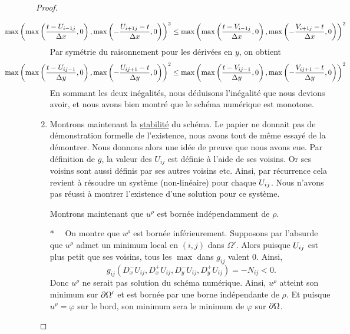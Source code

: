 \begin{proof}
\begin{enumerate}
        \begin{equation*}
            \hspace{-2.2cm} \max\left(\max\left(\dfrac{t - U_{i-1j}}{\Dx},0\right),\max\left(-\dfrac{U_{i+1j} - t}{\Delta x},0\right)\right)^2 \leq \max\left(\max\left(\dfrac{t - V_{i-1j}}{\Dx},0\right),\max\left(-\dfrac{V_{i+1j} - t}{\Delta x},0\right)\right)^2
        \end{equation*}
        Par symétrie du raisonnement pour les dérivées en $y$, on obtient
        \begin{equation*}
                \hspace{-2.2cm}\max\left(
                    \max\left(\dfrac{t - U_{ij-1}}{\Delta y}, 0\right),
                    \max\left(-\dfrac{U_{ij+1} - t}{\Delta y}, 0\right)
                \right)^2
            \leq
                \max\left(
                    \max\left(\dfrac{t - V_{ij-1}}{\Delta y}, 0\right),
                    \max\left(-\dfrac{V_{ij+1} - t}{\Delta y}, 0\right)
                \right)^2
        \end{equation*}
        En sommant les deux inégalités, nous déduisons l'inégalité que nous devions avoir, et nous avons bien montré que le schéma numérique est monotone.

        \item Montrons maintenant la \underline{stabilité} du schéma. 
        Le papier ne donnait pas de démonstration formelle de l'existence, nous avons tout de même essayé de la démontrer. Nous donnons alors une idée de preuve que nous avons eue. Par définition de $g$, la valeur des $U_{ij}$ est définie à l'aide de ses voisins. Or ses voisins sont aussi définis par ses autres voisins etc. Ainsi, par récurrence cela revient à résoudre un système (non-linéaire) pour chaque $U_{ij}$. Nous n'avons pas réussi à montrer l'existence d'une solution pour ce système. 

        Montrons maintenant que $u^{\rho}$ est bornée indépendamment de $\rho$.
         
         $\ast \quad$ On montre que $u^{\rho}$ est bornée inférieurement. Supposons par l'absurde que $u^{\rho}$ admet un minimum local en $(i,j)$ dans $\Omega'$. Alors puisque $U_{ij}$ est plus petit que ses voisins, tous les \og $\max$  \fg{}  dans $g_{ij}$ valent 0. Ainsi, 
         \begin{equation*}
             g_{ij}\left(D_x^-U_{ij},D_x^+U_{ij},D_y^-U_{ij},D_y^+U_{ij}\right) = -N_{ij} < 0.
         \end{equation*}
         Donc $u^{\rho}$ ne serait pas solution du schéma numérique. Ainsi, $u^{\rho}$ atteint son minimum sur $\mathop{}\!{\partial} \Omega'$ et est bornée par une borne indépendante de $\rho$. Et puisque $u^{\rho}=\varphi$ sur le bord, son minimum sera le minimum de $\varphi$ sur $\mathop{}\!{\partial} \Omega$.
         

\end{enumerate}
\end{proof}
